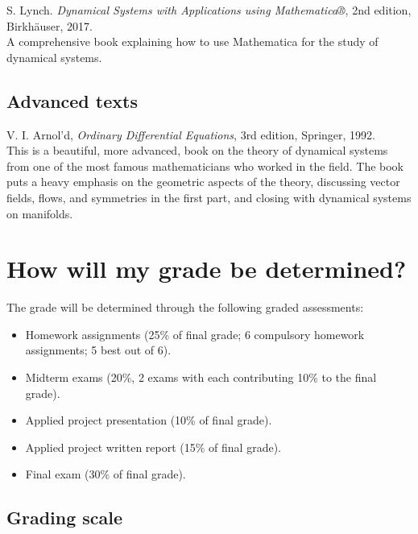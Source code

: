 \documentclass[11pt]{article}
\newcommand{\push}{\hangpara{2em}{1}}
\begin{document}
\push S. Lynch. \textit{Dynamical Systems with Applications using Mathematica®}, 2nd edition, Birkhäuser, 2017. \\
A comprehensive book explaining how to use Mathematica for the study of dynamical systems.


\subsection{Advanced texts}

\push V. I. Arnol'd, \textit{Ordinary Differential Equations}, 3rd edition, Springer, 1992. \\
This is a beautiful, more advanced, book on the theory of dynamical systems from one of the most famous mathematicians who worked in the field. The book puts a heavy emphasis on the geometric aspects of the theory, discussing vector fields, flows, and symmetries in the first part, and closing with dynamical systems on manifolds.


\section{How will my grade be determined?}

The grade will be determined through the following graded assessments:

\begin{itemize}[label={-},noitemsep]
  \item Homework assignments (25\% of final grade; 6 compulsory homework assignments; 5 best out of 6). 
  \item Midterm exams (20\%, 2 exams with each contributing 10\% to the final grade).
  \item Applied project presentation (10\% of final grade).
  \item Applied project written report (15\% of final grade).
  \item Final exam (30\% of final grade).
\end{itemize}

\subsection{Grading scale}
\end{document}

